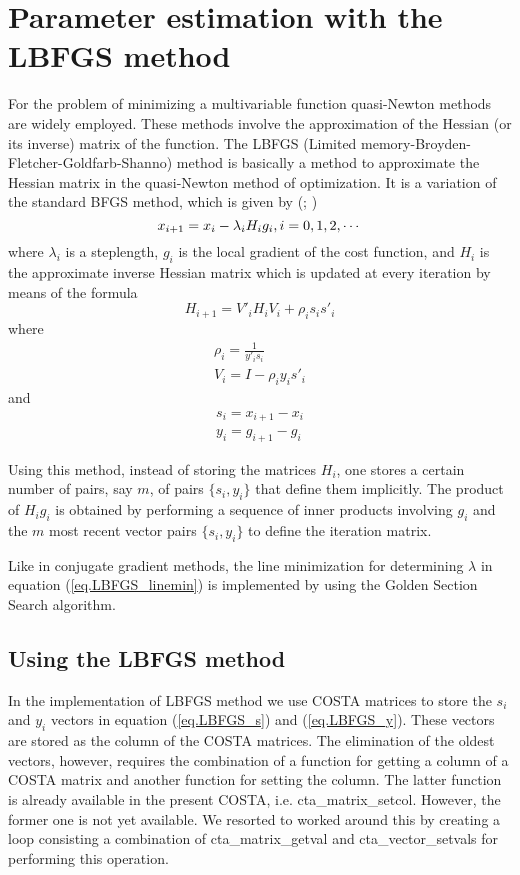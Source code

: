 \section{Parameter estimation with the LBFGS method}
For the problem of minimizing a multivariable function quasi-Newton methods
are widely employed. These methods involve the approximation of the Hessian
(or its inverse) matrix of the function. The LBFGS (Limited
memory-Broyden-Fletcher-Goldfarb-Shanno) method is basically a method to
approximate the Hessian matrix in the quasi-Newton method of optimization.
It is a variation of the standard BFGS method, which is given by (\cite{Nocedal1980}; \cite{Byrdetall1994})
\begin{equation}
  \label{eq.LBFGS_linemin}
    x_{i+1}=x_i-\lambda_iH_ig_i, \space \space i=0,1,2,\cdots
\end{equation}
where $\lambda_i$ is a steplength, $g_i$ is the local gradient of the cost
function, and $H_i$ is the approximate inverse Hessian matrix which is
updated at every iteration by means of the formula
\begin{equation}
    H_{i+1}=V'_i H_i V_i + \rho_i s_i s'_i
\end{equation}
where
\begin{eqnarray}
    \rho_i=\frac{1}{y'_i s_i} \\
    V_i=I-\rho_i y_i s'_i
\end{eqnarray}
and
\begin{eqnarray}
    s_i=x_{i+1}-x_i \label{eq.LBFGS_s} \\
    y_i=g_{i+1}-g_i \label{eq.LBFGS_y}
\end{eqnarray}

Using this method, instead of storing the matrices $H_i$, one stores a
certain number of pairs, say $m$, of pairs $\{s_i,y_i\}$ that define them
implicitly. The product of $H_i g_i$ is obtained by performing a sequence
of inner products involving $g_i$ and the $m$ most recent vector pairs
$\{s_i,y_i\}$ to define the iteration matrix.

Like in conjugate gradient methods, the line minimization for determining
$\lambda$ in equation (\ref{eq.LBFGS_linemin}) is implemented by using the
Golden Section Search algorithm.

\subsection{Using the LBFGS method}
In the implementation of LBFGS method we use COSTA matrices to store the
$s_i$ and $y_i$ vectors in equation (\ref{eq.LBFGS_s}) and
(\ref{eq.LBFGS_y}). These vectors are stored as the column of the COSTA
matrices. The elimination of the oldest vectors, however, requires the
combination of a function for getting a column of a COSTA matrix and
another function for setting the column. The latter function is already
available in the present COSTA, i.e. cta\_matrix\_setcol. However, the
former one is not yet available. We resorted to worked around this by
creating a loop consisting a combination of cta\_matrix\_getval and
cta\_vector\_setvals for performing this operation. 

